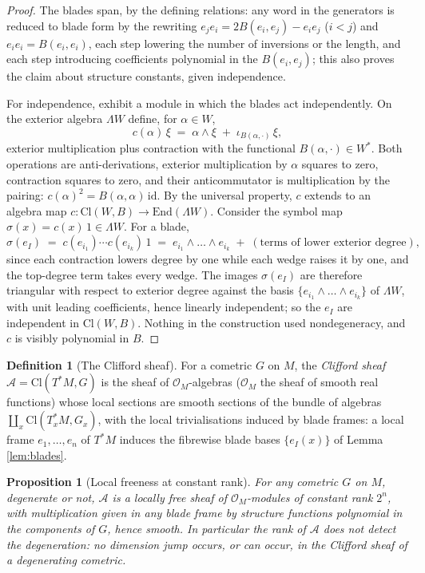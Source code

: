 \documentclass[11pt]{article}
\newtheorem{proposition}[theorem]{Proposition}
\theoremstyle{definition}
\newtheorem{definition}[theorem]{Definition}
\newcommand{\Cl}{\mathrm{Cl}}
\newcommand{\shA}{\mathcal{A}}
\begin{document}
\begin{proof}
The blades span, by the defining relations: any word in the generators is reduced to blade form by the rewriting $e_j e_i = 2B(e_i, e_j) - e_i e_j$ ($i < j$) and $e_i e_i = B(e_i, e_i)$, each step lowering the number of inversions or the length, and each step introducing coefficients polynomial in the $B(e_i,e_j)$; this also proves the claim about structure constants, given independence.

For independence, exhibit a module in which the blades act independently. On the exterior algebra $\Lambda W$ define, for $\alpha \in W$,
\[
c(\alpha)\,\xi \;=\; \alpha \wedge \xi \;+\; \iota_{B(\alpha, \cdot)}\,\xi ,
\]
exterior multiplication plus contraction with the functional $B(\alpha, \cdot) \in W^*$. Both operations are anti-derivations, exterior multiplication by $\alpha$ squares to zero, contraction squares to zero, and their anticommutator is multiplication by the pairing: $c(\alpha)^2 = B(\alpha,\alpha)\,\mathrm{id}$. By the universal property, $c$ extends to an algebra map $c : \Cl(W,B) \to \mathrm{End}(\Lambda W)$. Consider the symbol map $\sigma(x) = c(x)\,1 \in \Lambda W$. For a blade,
\[
\sigma(e_I) \;=\; c(e_{i_1}) \cdots c(e_{i_k})\,1 \;=\; e_{i_1} \wedge \dots \wedge e_{i_k} \;+\; (\text{terms of lower exterior degree}),
\]
since each contraction lowers degree by one while each wedge raises it by one, and the top-degree term takes every wedge. The images $\sigma(e_I)$ are therefore triangular with respect to exterior degree against the basis $\{e_{i_1} \wedge \dots \wedge e_{i_k}\}$ of $\Lambda W$, with unit leading coefficients, hence linearly independent; so the $e_I$ are independent in $\Cl(W,B)$. Nothing in the construction used nondegeneracy, and $c$ is visibly polynomial in $B$.
\end{proof}

\begin{definition}[The Clifford sheaf]\label{def:cliffordsheaf}
For a cometric $G$ on $M$, the \emph{Clifford sheaf} $\shA = \Cl(T^*M, G)$ is the sheaf of $\mathcal{O}_M$-algebras ($\mathcal{O}_M$ the sheaf of smooth real functions) whose local sections are smooth sections of the bundle of algebras $\coprod_{x} \Cl(T^*_xM, G_x)$, with the local trivialisations induced by blade frames: a local frame $e_1, \dots, e_n$ of $T^*M$ induces the fibrewise blade bases $\{e_I(x)\}$ of Lemma \ref{lem:blades}.
\end{definition}

\begin{proposition}[Local freeness at constant rank]\label{prop:localfree}
For any cometric $G$ on $M$, degenerate or not, $\shA$ is a locally free sheaf of $\mathcal{O}_M$-modules of constant rank $2^n$, with multiplication given in any blade frame by structure functions polynomial in the components of $G$, hence smooth. In particular the rank of $\shA$ does not detect the degeneration: no dimension jump occurs, or can occur, in the Clifford sheaf of a degenerating cometric.
\end{proposition}
\end{document}
